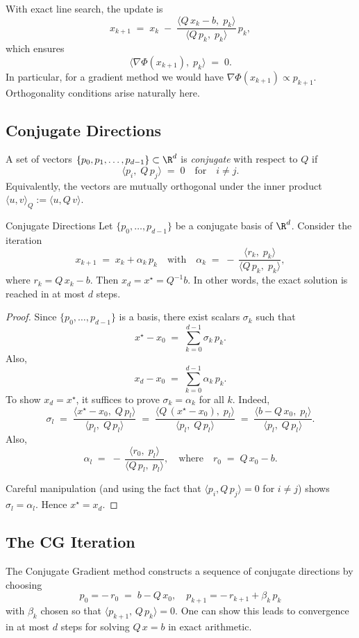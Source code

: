 With exact line search, the update is
\[
	x_{k+1}
	\;=\; x_k \;-\; \frac{\langle Q\,x_k - b,\;p_k\rangle}{\langle Q\,p_k,\;p_k\rangle}\,p_k,
\]
which ensures
\[
	\langle \nabla \Phi(x_{k+1}),\;p_k\rangle \;=\; 0.
\]
In particular, for a gradient method we would have \(\nabla \Phi(x_{k+1}) \propto p_{k+1}\). Orthogonality conditions arise naturally here.

\subsection*{Conjugate Directions}
A set of vectors \(\{p_0, p_1, \dots, p_{d-1}\}\subset \R^d\) is \emph{conjugate} with respect to \(Q\) if
\[
	\langle p_i,\;Q\,p_j\rangle \;=\; 0 \quad\text{for}\quad i\neq j.
\]
Equivalently, the vectors are mutually orthogonal under the inner product \(\langle u, v \rangle_Q := \langle u, Q\,v\rangle\).

\begin{lemma}{Conjugate Directions}{}
	Let \(\{p_0,\ldots,p_{d-1}\}\) be a conjugate basis of \(\R^d\). Consider the iteration
	\[
		x_{k+1} \;=\; x_k + \alpha_k\,p_k
		\quad\text{with}\quad
		\alpha_k \;=\; -\,\frac{\langle r_k,\;p_k\rangle}{\langle Q\,p_k,\;p_k\rangle},
	\]
	where \(r_k = Q\,x_k - b\). Then \(x_d = x^\star = Q^{-1}b\). In other words, the exact solution is reached in at most \(d\) steps.
\end{lemma}

\begin{proof}{}{}
	Since \(\{p_0,\ldots,p_{d-1}\}\) is a basis, there exist scalars \(\sigma_k\) such that
	\[
		x^\star - x_0
		\;=\; \sum_{k=0}^{d-1} \sigma_k\,p_k.
	\]
	Also,
	\[
		x_d - x_0
		\;=\; \sum_{k=0}^{d-1} \alpha_k\,p_k.
	\]
	To show \(x_d = x^\star\), it suffices to prove \(\sigma_k = \alpha_k\) for all \(k\). Indeed,
	\[
		\sigma_l
		\;=\; \frac{\langle x^\star - x_0,\;Q\,p_l\rangle}{\langle p_l,\;Q\,p_l\rangle}
		\;=\; \frac{\langle Q\,(x^\star - x_0),\;p_l\rangle}{\langle p_l,\;Q\,p_l\rangle}
		\;=\; \frac{\langle b - Q\,x_0,\;p_l\rangle}{\langle p_l,\;Q\,p_l\rangle}.
	\]
	Also,
	\[
		\alpha_l
		\;=\; -\,\frac{\langle r_0,\;p_l\rangle}{\langle Q\,p_l,\;p_l\rangle},
		\quad\text{where}\quad r_0 \;=\; Q\,x_0 - b.
	\]

	Careful manipulation (and using the fact that \(\langle p_i, Q\,p_j\rangle=0\) for \(i\neq j\)) shows \(\sigma_l = \alpha_l\). Hence \(x^\star = x_d\).

\end{proof}

\subsection*{The CG Iteration}
The Conjugate Gradient method constructs a sequence of conjugate directions by choosing
\[
	p_0 = -\,r_0 \;=\; b - Q\,x_0,
	\quad
	p_{k+1} = -\,r_{k+1} + \beta_k\,p_k
\]
with \(\beta_k\) chosen so that \(\langle p_{k+1},\,Q\,p_k\rangle=0\). One can show this leads to convergence in at most \(d\) steps for solving \(Q\,x = b\) in exact arithmetic.

